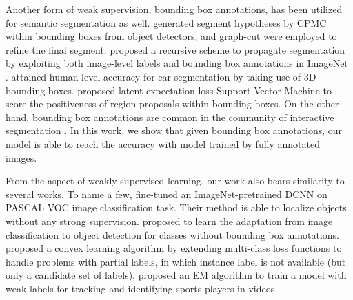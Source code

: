 Another form of weak supervision, bounding box annotations, has been
utilized for semantic segmentation as well. \citet{xia2013semantic}
generated segment hypotheses by CPMC \citep{carreira2012cpmc} within
bounding boxes from object detectors, and graph-cut were employed to
refine the final segment. \citet{guillaumin2014imagenet} proposed a
recursive scheme to propagate segmentation by exploiting both
image-level labels and bounding box annotations in ImageNet
\citep{deng2009imagenet}. \citet{chen2014beat} attained human-level
accuracy for car segmentation by taking use of 3D bounding
boxes. \citet{zhu2014learning} proposed latent expectation loss
Support Vector Machine to score the positiveness of region proposals
within bounding boxes. On the other hand, bounding box annotations are
common in the community of interactive segmentation
\citep{lempitsky2009image, rother2004grabcut, WuMilcut}. In this work,
we show that given bounding box annotations, our model is able to
reach the accuracy with model trained by fully annotated images. 

From the aspect of weakly supervised learning, our work also bears
similarity to several works. To name a few, \citet{oquab2014weakly}
fine-tuned an ImageNet-pretrained DCNN on PASCAL VOC image
classification task. Their method is able to localize objects without
any strong supervision. \citet{Hoffman14Lsda} proposed to learn the
adaptation from image classification to object detection for classes
without bounding box annotations. \citet{cour2011learning} proposed a
convex learning algorithm by extending multi-class loss functions to
handle problems with partial labels, in which instance label is not
available (but only a candidate set of labels). \citet{Lu2013sports}
proposed an EM algorithm to train a model with weak labels for
tracking and identifying sports players in videos.

